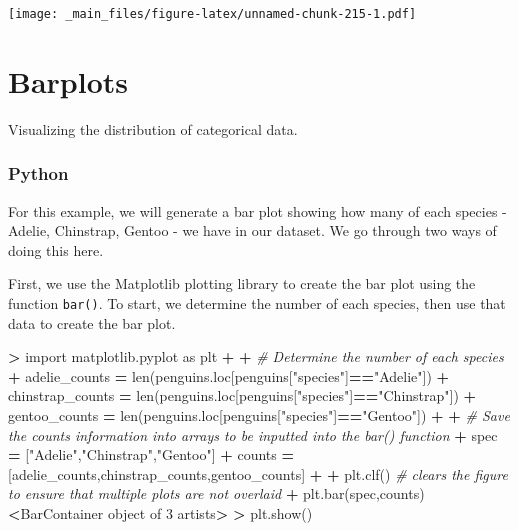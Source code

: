 \documentclass[
]{book}
\newenvironment{Shaded}{\begin{snugshade}}{\end{snugshade}}
\newcommand{\BuiltInTok}[1]{#1}
\newcommand{\CommentTok}[1]{\textcolor[rgb]{0.56,0.35,0.01}{\textit{#1}}}
\newcommand{\DecValTok}[1]{\textcolor[rgb]{0.00,0.00,0.81}{#1}}
\newcommand{\ImportTok}[1]{#1}
\newcommand{\NormalTok}[1]{#1}
\newcommand{\OperatorTok}[1]{\textcolor[rgb]{0.81,0.36,0.00}{\textbf{#1}}}
\newcommand{\StringTok}[1]{\textcolor[rgb]{0.31,0.60,0.02}{#1}}
\begin{document}
\texttt{[image: \_main\_files/figure-latex/unnamed-chunk-215-1.pdf]}

\hypertarget{barplots}{%
\section{Barplots}\label{barplots}}

Visualizing the distribution of categorical data.

\hypertarget{python-39}{%
\subsubsection*{Python}\label{python-39}}

For this example, we will generate a bar plot showing how many of each species - Adelie, Chinstrap, Gentoo - we have in our dataset. We go through two ways of doing this here.

First, we use the Matplotlib plotting library to create the bar plot using the function \texttt{bar()}. To start, we determine the number of each species, then use that data to create the bar plot.

\begin{Shaded}
\begin{Highlighting}[]
\OperatorTok{\textgreater{}} \ImportTok{import}\NormalTok{ matplotlib.pyplot }\ImportTok{as}\NormalTok{ plt }
\OperatorTok{+} 
\OperatorTok{+} \CommentTok{\# Determine the number of each species}
\OperatorTok{+}\NormalTok{ adelie\_counts }\OperatorTok{=} \BuiltInTok{len}\NormalTok{(penguins.loc[penguins[}\StringTok{"species"}\NormalTok{]}\OperatorTok{==}\StringTok{"Adelie"}\NormalTok{])}
\OperatorTok{+}\NormalTok{ chinstrap\_counts }\OperatorTok{=} \BuiltInTok{len}\NormalTok{(penguins.loc[penguins[}\StringTok{"species"}\NormalTok{]}\OperatorTok{==}\StringTok{"Chinstrap"}\NormalTok{])}
\OperatorTok{+}\NormalTok{ gentoo\_counts }\OperatorTok{=} \BuiltInTok{len}\NormalTok{(penguins.loc[penguins[}\StringTok{"species"}\NormalTok{]}\OperatorTok{==}\StringTok{"Gentoo"}\NormalTok{])}
\OperatorTok{+} 
\OperatorTok{+} \CommentTok{\# Save the counts information into arrays to be inputted into the bar() function}
\OperatorTok{+}\NormalTok{ spec }\OperatorTok{=}\NormalTok{ [}\StringTok{"Adelie"}\NormalTok{,}\StringTok{"Chinstrap"}\NormalTok{,}\StringTok{"Gentoo"}\NormalTok{]}
\OperatorTok{+}\NormalTok{ counts }\OperatorTok{=}\NormalTok{ [adelie\_counts,chinstrap\_counts,gentoo\_counts]}
\OperatorTok{+} 
\OperatorTok{+}\NormalTok{ plt.clf() }\CommentTok{\# clears the figure to ensure that multiple plots are not overlaid}
\OperatorTok{+}\NormalTok{ plt.bar(spec,counts)}
\OperatorTok{\textless{}}\NormalTok{BarContainer }\BuiltInTok{object}\NormalTok{ of }\DecValTok{3}\NormalTok{ artists}\OperatorTok{\textgreater{}}
\OperatorTok{\textgreater{}}\NormalTok{ plt.show()}
\end{Highlighting}
\end{Shaded}
\end{document}
